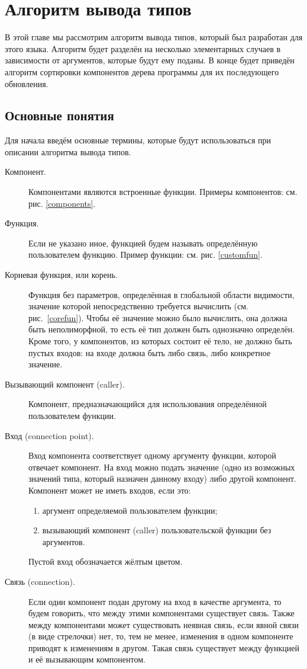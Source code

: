 \chapter{Алгоритм вывода типов}\label{type_inf}
В этой главе мы рассмотрим алгоритм вывода типов, который был разработан для этого языка. Алгоритм будет разделён на несколько элементарных случаев в зависимости от аргументов, которые будут ему поданы. В конце будет приведён алгоритм сортировки компонентов дерева программы для их последующего обновления. 
\section{Основные понятия}
Для начала введём основные термины, которые будут использоваться при описании алгоритма вывода типов.
\begin{description}
	\item[Компонент.] Компонентами являются встроенные функции. Примеры компонентов: см. рис. \ref{components}.
	\item[Функция.] Если не указано иное, функцией будем называть определённую пользователем функцию. Пример функции: см. рис. \ref{customfun}.
	\item[Корневая функция, или корень.] Функция без параметров, определённая в глобальной области видимости, значение которой непосредственно требуется вычислить (см. рис.~\ref{corefun}). Чтобы её значение можно было вычислить, она должна быть неполиморфной, то есть её тип должен быть однозначно определён. Кроме того, у компонентов, из которых состоит её тело, не должно быть пустых входов: на входе должна быть либо связь, либо конкретное значение.
	\item[Вызывающий компонент (caller).] Компонент, предназначающийся для использования определённой пользователем функции.
	\item[Вход (connection point).] Вход компонента соответствует одному аргументу функции, которой отвечает компонент. На вход можно подать значение (одно из возможных значений типа, который назначен данному входу) либо другой компонент. Компонент может не иметь входов, если это: 
	\begin{enumerate}[1)]
		\item аргумент определяемой пользователем функции;
		\item вызывающий компонент (caller) пользовательской функции без аргументов.
	\end{enumerate} 
	Пустой вход обозначается жёлтым цветом.
	\item[Связь (connection).] Если один компонент подан другому на вход в качестве аргумента, то будем говорить, что между этими компонентами существует связь. Также между компонентами может существовать неявная связь, если явной связи (в виде стрелочки) нет, то, тем не менее, изменения в одном компоненте приводят к изменениям в другом. Такая связь существует между функцией и её вызывающим компонентом.

\end{description}
